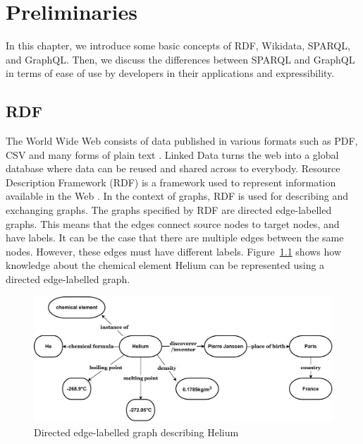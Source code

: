\chapter{Preliminaries}
In this chapter, we introduce some basic concepts of RDF, Wikidata, SPARQL, and GraphQL. Then, we discuss the differences between SPARQL and GraphQL in terms of ease of use by developers in their applications and expressibility.

\section{RDF}
The World Wide Web consists of data published in various formats such as PDF, CSV and many forms of plain text \cite{Ruth2013}. Linked Data turns the web into a global database where data can be reused and shared across to everybody. Resource Description Framework (RDF) is a framework used to represent information available in the Web \cite{R.Cyganiak2014}. In the context of graphs, RDF is used for describing and exchanging graphs. The graphs specified by RDF are directed edge-labelled graphs. This means that the edges connect source nodes to target nodes, and have labels. It can be the case that there are multiple edges between the same nodes. However, these edges must have different labels. Figure~\ref{fig:figure 1} shows how knowledge about the chemical element Helium can be represented using a directed edge-labelled graph.

\begin{figure}[h]
  \centering
  \includegraphics[width=0.80\linewidth]{images/del_graph.drawio.pdf}
  \caption{Directed edge-labelled graph describing Helium}
  \label{fig:figure 1}
\end{figure}

